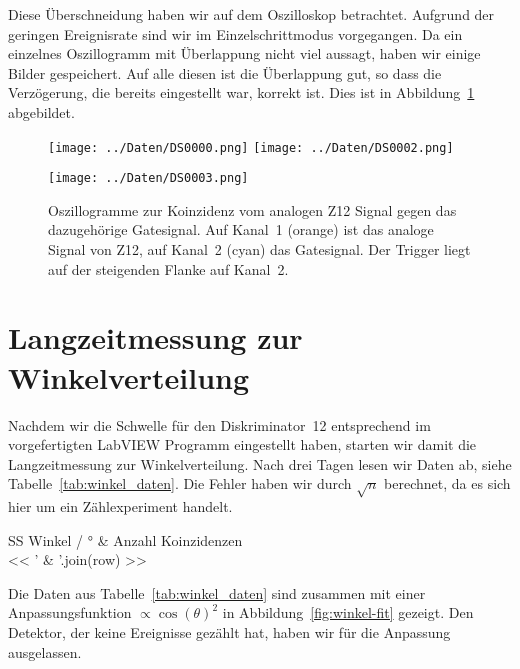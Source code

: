\documentclass[11pt, ngerman, fleqn, DIV=15, headinclude, BCOR=2cm]{scrreprt}
\begin{document}
Diese Überschneidung haben wir auf dem Oszilloskop betrachtet. Aufgrund der
geringen Ereignisrate sind wir im Einzelschrittmodus vorgegangen. Da ein
einzelnes Oszillogramm mit Überlappung nicht viel aussagt, haben wir einige Bilder
gespeichert. Auf alle diesen ist die Überlappung gut, so dass die Verzögerung,
die bereits eingestellt war, korrekt ist. Dies ist in
Abbildung~\ref{fig:koinzidenz} abgebildet.

\begin{figure}[htbp]
    \centering
    \texttt{[image: ../Daten/DS0000.png]}
    \hfill
    \texttt{[image: ../Daten/DS0002.png]}

    \vspace*{5ex}

    \texttt{[image: ../Daten/DS0003.png]}
    \caption{%
        Oszillogramme zur Koinzidenz vom analogen Z12 Signal gegen das
        dazugehörige Gatesignal. Auf Kanal~1 (orange) ist das analoge Signal
        von Z12, auf Kanal~2 (cyan) das Gatesignal. Der Trigger liegt auf der
        steigenden Flanke auf Kanal~2.
    }
    \label{fig:koinzidenz}
\end{figure}

\section{Langzeitmessung zur Winkelverteilung}
\label{sec:langzeit_winkel}

Nachdem wir die Schwelle für den Diskriminator~12 entsprechend im
vorgefertigten LabVIEW Programm eingestellt haben, starten wir damit die
Langzeitmessung zur Winkelverteilung. Nach drei Tagen lesen wir Daten ab, siehe
Tabelle~\ref{tab:winkel_daten}. Die Fehler haben wir durch $\sqrt n$ berechnet,
da es sich hier um ein Zählexperiment handelt.

\begin{table}[htbp]
    \centering
    \begin{tabular}{SS}
        {Winkel / \si\degree} & {Anzahl Koinzidenzen} \\
        \midrule
        << ' & '.join(row) >> \\
    \end{tabular}
    \caption{%
        Anzahl der Koinzidenzen für die verschiedenen Raumrichtungen.
    }
    \label{tab:winkel_daten}
\end{table}

Die Daten aus Tabelle~\ref{tab:winkel_daten} sind zusammen mit einer
Anpassungsfunktion $\propto \cos(\theta)^2$ in Abbildung~\ref{fig:winkel-fit}
gezeigt. Den Detektor, der keine Ereignisse gezählt hat, haben wir für die
Anpassung ausgelassen.
\end{document}
